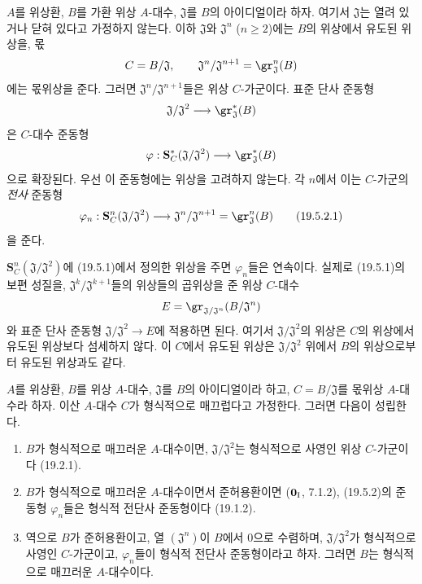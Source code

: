 \begin{env}[19.5.2]
\label{0.19.5.2-fr}
$A$를 위상환, $B$를 가환 위상 $A$-대수, $\mathfrak J$를
$B$의 아이디얼이라 하자. 여기서 $\mathfrak J$는 열려 있거나
닫혀 있다고 가정하지 않는다. 이하 $\mathfrak J$와
$\mathfrak J^n$ ($n\geq2$)에는 $B$의 위상에서 유도된 위상을,
몫
\[
  C=B/\mathfrak J,\qquad
  \mathfrak J^n/\mathfrak J^{n+1}
  =\gr_{\mathfrak J}^n(B)
\]
에는 몫위상을 준다. 그러면
$\mathfrak J^n/\mathfrak J^{n+1}$들은 위상 $C$-가군이다. 표준
단사 준동형
\[
  \mathfrak J/\mathfrak J^2\longrightarrow
  \gr_{\mathfrak J}^*(B)
\]
은 $C$-대수 준동형
\[
  \varphi:\mathbf S_C^*(\mathfrak J/\mathfrak J^2)
  \longrightarrow\gr_{\mathfrak J}^*(B)
\]
으로 확장된다. 우선 이 준동형에는 위상을 고려하지 않는다. 각
$n$에서 이는 $C$-가군의 \emph{전사} 준동형
\begin{equation}
\label{0.19.5.2.1-fr}
  \varphi_n:\mathbf S_C^n(\mathfrak J/\mathfrak J^2)
  \longrightarrow\mathfrak J^n/\mathfrak J^{n+1}
  =\gr_{\mathfrak J}^n(B)
  \tag{19.5.2.1}
\end{equation}
을 준다.


$\mathbf S_C^n(\mathfrak J/\mathfrak J^2)$에 (19.5.1)에서 정의한
위상을 주면 $\varphi_n$들은 연속이다. 실제로 (19.5.1)의 보편
성질을, $\mathfrak J^k/\mathfrak J^{k+1}$들의 위상들의 곱위상을
준 위상 $C$-대수
\[
  E=\gr_{\mathfrak J/\mathfrak J^n}(B/\mathfrak J^n)
\]
와 표준 단사 준동형
$\mathfrak J/\mathfrak J^2\to E$에 적용하면 된다. 여기서
$\mathfrak J/\mathfrak J^2$의 위상은 $C$의 위상에서 유도된
위상보다 섬세하지 않다. 이 $C$에서 유도된 위상은
$\mathfrak J/\mathfrak J^2$ 위에서 $B$의 위상으로부터 유도된
위상과도 같다.
\end{env}

\begin{theorem}[19.5.3]
\label{0.19.5.3-fr}
$A$를 위상환, $B$를 위상 $A$-대수, $\mathfrak J$를 $B$의
아이디얼이라 하고, $C=B/\mathfrak J$를 몫위상 $A$-대수라 하자.
이산 $A$-대수 $C$가 형식적으로 매끄럽다고 가정한다. 그러면 다음이
성립한다.
\begin{enumerate}
  \item[\rm(i)] $B$가 형식적으로 매끄러운 $A$-대수이면,
  $\mathfrak J/\mathfrak J^2$는 형식적으로 사영인 위상
  $C$-가군이다 (19.2.1).
  \item[\rm(ii)] $B$가 형식적으로 매끄러운 $A$-대수이면서
  준허용환이면 ($\mathbf 0_{\rm I}$, 7.1.2), (19.5.2)의
  준동형 $\varphi_n$들은 형식적 전단사 준동형이다 (19.1.2).
  \item[\rm(iii)] 역으로 $B$가 준허용환이고, 열
  $(\mathfrak J^n)$이 $B$에서 $0$으로 수렴하며,
  $\mathfrak J/\mathfrak J^2$가 형식적으로 사영인 $C$-가군이고,
  $\varphi_n$들이 형식적 전단사 준동형이라고 하자. 그러면 $B$는
  형식적으로 매끄러운 $A$-대수이다.
\end{enumerate}
\end{theorem}

